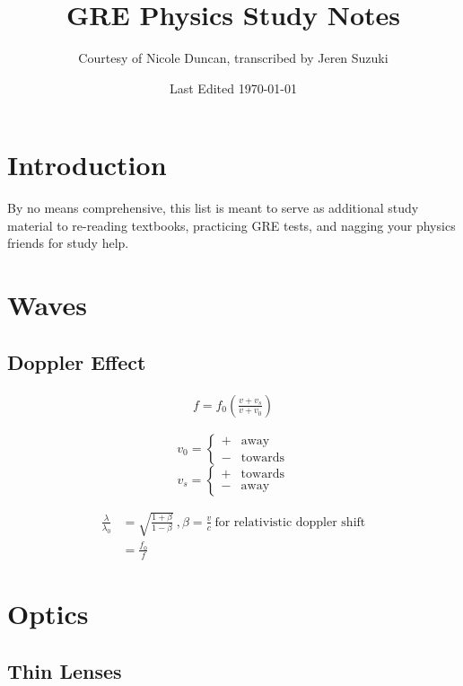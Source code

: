\documentclass[10pt,a4paper]{article}
\title{GRE Physics Study Notes}
\author{Courtesy of Nicole Duncan, transcribed by Jeren Suzuki}
\date{Last Edited \today}
\begin{document}
\maketitle
{}
\newpage
\tableofcontents
\newpage
{}


\section*{Introduction}
By no means comprehensive, this list is meant to serve as additional study material to re-reading textbooks, practicing GRE tests, and nagging your physics friends for study help.


\section{Waves}
\subsection{Doppler Effect}

\begin{align}
    f = f_0 \left( \frac{v + v_s}{v + v_0} \right)
\end{align}

\[
 v_0 =
  \begin{cases}
   + & \textrm{away} \\
   - & \textrm{towards}
  \end{cases}
\]
\[
 v_s =
  \begin{cases}
   + & \textrm{towards} \\
   - & \textrm{away}
  \end{cases}
\]

\begin{align}
\frac{\lambda}{\lambda_0} &= \sqrt{\frac{1+\beta}{1- \beta}}~,\beta = \frac{v}{c}~ \textrm{for relativistic doppler shift}\\
&= \frac{f_0}{f}
\end{align}


\section{Optics}
\subsection{Thin Lenses}
\end{document}
